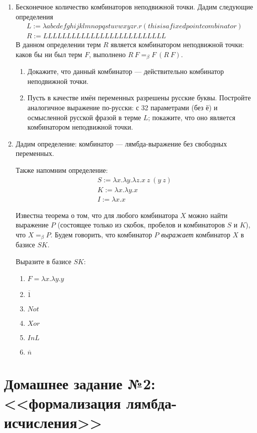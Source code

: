 \documentclass[10pt,a4paper,oneside]{article}
\begin{document}
\begin{enumerate}
\item Бесконечное количество комбинаторов неподвижной точки. Дадим следующие определения
$$\begin{array}{l}
L := \lambda abcdefghijklmnopqstuvwxyzr.r(thisisafixedpointcombinator)\\
R := LLLLLLLLLLLLLLLLLLLLLLLLLL\end{array}$$
В данном определении терм $R$ является комбинатором неподвижной точки: каков бы ни был терм
$F$, выполнено $R\ F =_\beta F\ (R\ F)$.
\begin{enumerate}
\item Докажите, что данный комбинатор --- действительно комбинатор неподвижной точки.
\item Пусть в качестве имён переменных разрешены русские буквы. Постройте аналогичное выражение
по-русски: с 32 параметрами (без ё) и осмысленной русской фразой в терме $L$; покажите, что оно является
комбинатором неподвижной точки.
\end{enumerate}

\item Дадим определение: комбинатор --- лямбда-выражение без свободных переменных.

Также напомним определение:
$$\begin{array}{l}
S := \lambda x.\lambda y.\lambda z.x\ z\ (y\ z)\\
K := \lambda x.\lambda y.x\\
I := \lambda x.x
\end{array}$$

Известна теорема о том, что для любого комбинатора $X$ можно найти выражение $P$
(состоящее только из скобок, пробелов и комбинаторов $S$ и $K$), что $X =_\beta P$.
Будем говорить, что комбинатор $P$ \emph{выражает} комбинатор $X$ в базисе $SK$.

Выразите в базисе $SK$:
\begin{enumerate}
\item $F = \lambda x.\lambda y.y$
\item $\overline{1}$
\item $Not$
\item $Xor$
\item $InL$
\item $\overline{n}$
\end{enumerate}

\end{enumerate}

\section*{Домашнее задание №2: <<формализация лямбда-исчисления>>}
\end{document}
